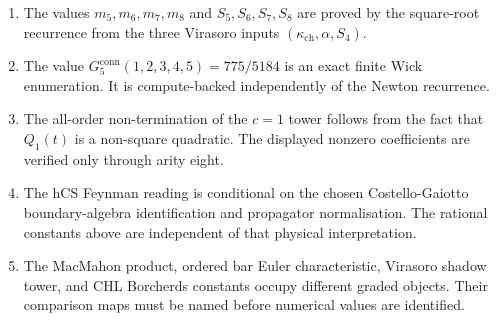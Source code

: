 \documentclass[11pt]{article}
\begin{document}
\begin{enumerate}
\item The values $m_5,m_6,m_7,m_8$ and $S_5,S_6,S_7,S_8$ are proved by
the square-root recurrence from the three Virasoro inputs
$(\kappa_{\mathrm{ch}},\alpha,S_4)$.
\item The value $G_5^{\mathrm{conn}}(1,2,3,4,5)=775/5184$ is an exact
finite Wick enumeration. It is compute-backed independently of the
Newton recurrence.
\item The all-order non-termination of the $c=1$ tower follows from
the fact that $Q_1(t)$ is a non-square quadratic. The displayed
nonzero coefficients are verified only through arity eight.
\item The hCS Feynman reading is conditional on the chosen
Costello-Gaiotto boundary-algebra identification and propagator
normalisation. The rational constants above are independent of that
physical interpretation.
\item The MacMahon product, ordered bar Euler characteristic, Virasoro
shadow tower, and CHL Borcherds constants occupy different graded
objects. Their comparison maps must be named before numerical values
are identified.
\end{enumerate}
\end{document}
